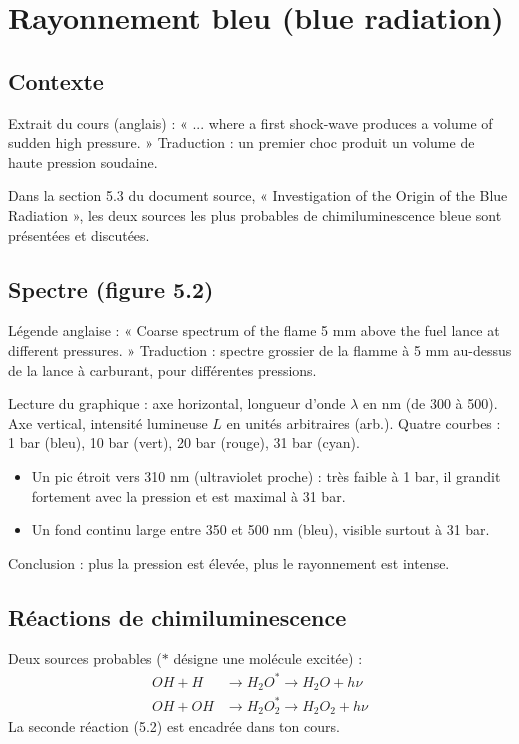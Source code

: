 \documentclass{article}
\begin{document}
\section{Rayonnement bleu (blue radiation)}

\subsection{Contexte}
Extrait du cours (anglais) : « ... where a first shock-wave produces a volume of sudden high pressure. » Traduction : un premier choc produit un volume de haute pression soudaine.

Dans la section 5.3 du document source, « Investigation of the Origin of the Blue Radiation », les deux sources les plus probables de chimiluminescence bleue sont présentées et discutées.

\subsection{Spectre (figure 5.2)}
Légende anglaise : « Coarse spectrum of the flame 5 mm above the fuel lance at different pressures. » Traduction : spectre grossier de la flamme à 5 mm au-dessus de la lance à carburant, pour différentes pressions.

Lecture du graphique : axe horizontal, longueur d'onde $\lambda$ en nm (de 300 à 500). Axe vertical, intensité lumineuse $L$ en unités arbitraires (arb.). Quatre courbes : 1 bar (bleu), 10 bar (vert), 20 bar (rouge), 31 bar (cyan).
\begin{itemize}
\item Un pic étroit vers 310 nm (ultraviolet proche) : très faible à 1 bar, il grandit fortement avec la pression et est maximal à 31 bar.
\item Un fond continu large entre 350 et 500 nm (bleu), visible surtout à 31 bar.
\end{itemize}
Conclusion : plus la pression est élevée, plus le rayonnement est intense.

\subsection{Réactions de chimiluminescence}
Deux sources probables ($*$ désigne une molécule excitée) :
\begin{align}
OH + H &\to H_2O^* \to H_2O + h\nu \\
OH + OH &\to H_2O_2^* \to H_2O_2 + h\nu
\end{align}
La seconde réaction (5.2) est encadrée dans ton cours.
\end{document}
